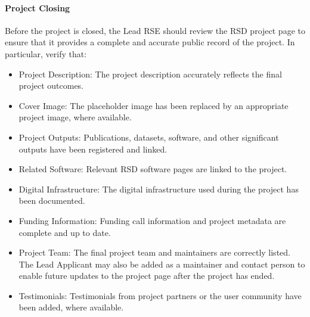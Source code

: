 \paragraph{Project Closing}
Before the project is closed, the Lead RSE should review the RSD project page to ensure that it provides a complete
and accurate public record of the project. In particular, verify that:
\begin{itemize}
   \item Project Description: The project description accurately reflects the final project outcomes.
   \item Cover Image: The placeholder image has been replaced by an appropriate project image, where available.
   \item Project Outputs: Publications, datasets, software, and other significant outputs have been registered and 
   linked.
   \item Related Software: Relevant RSD software pages are linked to the project.
   \item Digital Infrastructure: The digital infrastructure used during the project has been documented.
   \item Funding Information: Funding call information and project metadata are complete and up to date.
   \item Project Team: The final project team and maintainers are correctly listed. The Lead Applicant may also be 
   added as a maintainer and contact person to enable future updates to the project page after the project has ended.
   \item Testimonials: Testimonials from project partners or the user community have been added, where available.
\end{itemize}
